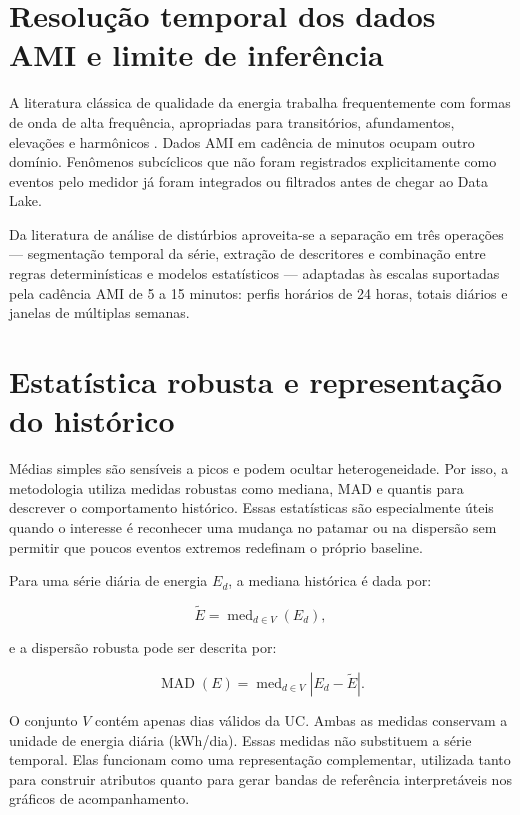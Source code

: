 \section{Resolução temporal dos dados AMI e limite de inferência}\label{resoluuxe7uxe3o-temporal-dos-dados-ami-e-limite-de-inferuxeancia}

A literatura clássica de qualidade da energia trabalha frequentemente com formas de onda de alta frequência, apropriadas para transitórios, afundamentos, elevações e harmônicos \autocite{bollen2006}. Dados AMI em cadência de minutos ocupam outro domínio. Fenômenos subcíclicos que não foram registrados explicitamente como eventos pelo medidor já foram integrados ou filtrados antes de chegar ao Data Lake.

Da literatura de análise de distúrbios aproveita-se a separação em três operações --- segmentação temporal da série, extração de descritores e combinação entre regras determinísticas e modelos estatísticos \autocite{bollen2007} --- adaptadas às escalas suportadas pela cadência AMI de 5 a 15 minutos: perfis horários de 24 horas, totais diários e janelas de múltiplas semanas.

\section{Estatística robusta e representação do histórico}\label{estatuxedstica-robusta-e-representauxe7uxe3o-do-histuxf3rico}

Médias simples são sensíveis a picos e podem ocultar heterogeneidade. Por isso, a metodologia utiliza medidas robustas como mediana, MAD e quantis para descrever o comportamento histórico. Essas estatísticas são especialmente úteis quando o interesse é reconhecer uma mudança no patamar ou na dispersão sem permitir que poucos eventos extremos redefinam o próprio baseline.

Para uma série diária de energia \(E_d\), a mediana histórica é dada por:

\[\widetilde E=\operatorname{med}_{d\in V}(E_d),\]

e a dispersão robusta pode ser descrita por:

\[\operatorname{MAD}(E)=\operatorname{med}_{d\in V}|E_d-\widetilde E|.\]

O conjunto $V$ contém apenas dias válidos da UC. Ambas as medidas conservam a unidade de energia diária (kWh/dia). Essas medidas não substituem a série temporal. Elas funcionam como uma representação complementar, utilizada tanto para construir atributos quanto para gerar bandas de referência interpretáveis nos gráficos de acompanhamento.

